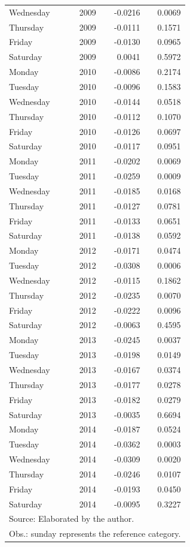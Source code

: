 \documentclass[12pt,openright,oneside,a4paper,english,french,spanish]{abntex2}
\numberwithin{table}{section} %
\numberwithin{figure}{section} %
\begin{document}
\begin{otherlanguage}{english}
\begin{table}[H]
\begin{center}
\begin{tiny}
\begin{tabular}{lrrr}
  Wednesday &  2009 & -0.0216 & 0.0069 \\ 
  Thursday &  2009 & -0.0111 & 0.1571 \\ 
  Friday &  2009 & -0.0130 & 0.0965 \\ 
  Saturday &  2009 & 0.0041 & 0.5972 \\ 
  Monday &  2010 & -0.0086 & 0.2174 \\ 
  Tuesday &  2010 & -0.0096 & 0.1583 \\ 
  Wednesday &  2010 & -0.0144 & 0.0518 \\ 
  Thursday &  2010 & -0.0112 & 0.1070 \\ 
  Friday &  2010 & -0.0126 & 0.0697 \\ 
  Saturday &  2010 & -0.0117 & 0.0951 \\ 
  Monday &  2011 & -0.0202 & 0.0069 \\ 
  Tuesday &  2011 & -0.0259 & 0.0009 \\ 
  Wednesday &  2011 & -0.0185 & 0.0168 \\ 
  Thursday &  2011 & -0.0127 & 0.0781 \\ 
  Friday &  2011 & -0.0133 & 0.0651 \\ 
  Saturday &  2011 & -0.0138 & 0.0592 \\ 
  Monday &  2012 & -0.0171 & 0.0474 \\ 
  Tuesday &  2012 & -0.0308 & 0.0006 \\ 
  Wednesday &  2012 & -0.0115 & 0.1862 \\ 
  Thursday &  2012 & -0.0235 & 0.0070 \\ 
  Friday &  2012 & -0.0222 & 0.0096 \\ 
  Saturday &  2012 & -0.0063 & 0.4595 \\ 
  Monday &  2013 & -0.0245 & 0.0037 \\ 
  Tuesday &  2013 & -0.0198 & 0.0149 \\ 
  Wednesday &  2013 & -0.0167 & 0.0374 \\ 
  Thursday &  2013 & -0.0177 & 0.0278 \\ 
  Friday &  2013 & -0.0182 & 0.0279 \\ 
  Saturday &  2013 & -0.0035 & 0.6694 \\ 
  Monday &  2014 & -0.0187 & 0.0524 \\ 
  Tuesday &  2014 & -0.0362 & 0.0003 \\ 
  Wednesday &  2014 & -0.0309 & 0.0020 \\ 
  Thursday &  2014 & -0.0246 & 0.0107 \\ 
  Friday &  2014 & -0.0193 & 0.0450 \\ 
  Saturday &  2014 & -0.0095 & 0.3227 \\ 
   \hline
\multicolumn{4}{l}{Source: Elaborated by the author.} \\ 
\multicolumn{4}{l}{Obs.: sunday represents the reference category.}
\end{tabular}
\end{tiny}
\end{center}
\label{tab:resultados_efeito_dia_semana_entrada}
\end{table}


\end{otherlanguage}
\end{document}
